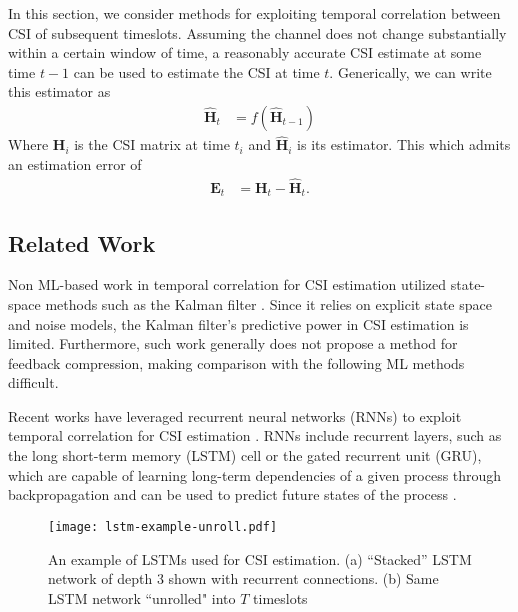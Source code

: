 In this section, we consider methods for exploiting temporal correlation between CSI of subsequent timeslots.
Assuming the channel does not change substantially within a certain window of time,
a reasonably accurate CSI estimate at some time $t-1$ can be used to estimate the CSI at time $t$.
Generically, we can write this estimator as
\begin{align}
\hat{\mathbf H}_t &= f(\hat{\mathbf H}_{t-1}) \label{eq:gen_estim}
\end{align}
Where $\mathbf{H}_i$ is the CSI matrix at time $t_i$ and $\hat{\mathbf H}_i$ is its estimator. 
This which admits an estimation error of 
\begin{align}
\mathbf E_{t} &= \mathbf H_{t} - \hat{\mathbf H}_{t}. \label{eq:diff_err}
\end{align}

\subsection{Related Work}

Non ML-based work in temporal correlation for CSI estimation utilized state-space methods such as the Kalman filter \cite{ref:Huber2006improved,ref:Ali2020BayesKalmanFilter,ref:Kim2021KalmanVsML}. Since it relies on explicit state space and noise models, the Kalman filter's predictive power in CSI estimation is limited. Furthermore, such work generally does not propose a method for feedback compression, making comparison with the following ML methods difficult.

Recent works have leveraged recurrent neural networks (RNNs) to exploit temporal correlation for CSI estimation \cite{ref:Lu2019RecCsiNet, ref:Liao2019BiLSTM, ref:Li2020SpatTempLSTM,
 ref:Jang2019Delay,ref:Wang2019CsiNetLSTM}. RNNs include recurrent layers, such as the long short-term memory (LSTM) cell or the gated recurrent unit (GRU), which are capable of learning long-term dependencies of a given process through backpropagation \cite{ref:Hermans2013Training} and can be used to predict future states of the process \cite{ref:Pascanu2014HowTo}.

\begin{figure}[htb]
	\centering
	\texttt{[image: lstm-example-unroll.pdf]}
	\medskip
	\caption{An example of LSTMs used for CSI estimation. (a) ``Stacked'' LSTM network of depth 3 shown with recurrent connections. (b) Same LSTM network ``unrolled" into $T$ timeslots }
	\label{fig:lstm_example}
\end{figure}

